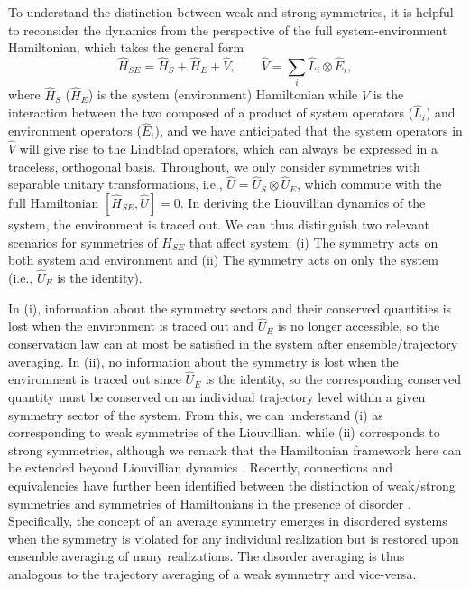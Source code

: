 To understand the distinction between weak and strong symmetries, it is helpful to reconsider the dynamics from the perspective of the full system-environment Hamiltonian, which takes the general form
\begin{equation}
    \hat H_{SE} = \hat H_S + \hat H_E + \hat V, \qquad \hat V = \sum_i \hat L_i \otimes \hat E_i,
\end{equation}
where $\hat H_S$ ($\hat H_E$) is the system (environment) Hamiltonian while $V$ is the interaction between the two composed of a product of system operators ($\hat L_i$) and environment operators ($\hat E_i$), and we have anticipated that the system operators in $\hat V$ will give rise to the Lindblad operators, which can always be expressed in a traceless, orthogonal basis.
Throughout, we only consider symmetries with separable unitary transformations, i.e., $\hat U = \hat U_S \otimes \hat U_E$, which commute with the full Hamiltonian $[\hat H_{SE}, \hat U] = 0$. In deriving the Liouvillian dynamics of the system, the environment is traced out. We can thus distinguish two relevant scenarios for symmetries of $H_{SE}$ that affect system: (i) The symmetry acts on both system and environment and (ii) The symmetry acts on only the system (i.e., $\hat U_E$ is the identity). 

In (i), information about the symmetry sectors and their conserved quantities is lost when the environment is traced out and $\hat U_E$ is no longer accessible, so the conservation law can at most be satisfied in the system after ensemble/trajectory averaging. 
In (ii), no information about the symmetry is lost when the environment is traced out since $\hat U_E$ is the identity, so the corresponding conserved quantity must be conserved on an individual trajectory level within a given symmetry sector of the system. From this, we can understand (i) as corresponding to weak symmetries of the Liouvillian, while (ii) corresponds to strong symmetries, although we remark that the Hamiltonian framework here can be extended beyond Liouvillian dynamics \cite{Manzano2018}. Recently, connections and equivalencies have further been identified between the distinction of weak/strong symmetries and symmetries of Hamiltonians in the presence of disorder \cite{Ma2023a,Ma2023b}. Specifically, the concept of an average symmetry emerges in disordered systems when the symmetry is violated for any individual realization but is restored upon ensemble averaging of many realizations. The disorder averaging is thus analogous to the trajectory averaging of a weak symmetry and vice-versa.

